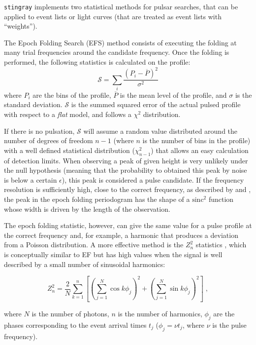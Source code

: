 \documentclass[twocolumn]{aastex62}
\newcommand{\zsq}{\ensuremath{Z^2_n}\xspace}
\newcommand{\stingray}{\texttt{stingray}\xspace}
\begin{document}
\stingray implements two statistical methods for pulsar searches, that can be applied to event lists or light curves (that are treated as event lists with ``weights'').

The Epoch Folding Search (EFS) method consists of executing the folding at many trial frequencies around the candidate frequency.
Once the folding is performed, the following statistics is calculated on the profile:
\begin{equation}
\mathcal{S} = \sum_i\frac{(P_i - \overline{P})^2}{\sigma^2}
\end{equation}
where $P_i$ are the bins of the profile, $\overline{P}$ is the mean level of the profile, and $\sigma$ is the standard deviation.
$\mathcal{S}$ is the summed squared error of the actual pulsed profile with respect to a \textit{flat} model, and follows a $\chi^2$ distribution.

If there is no pulsation, $\mathcal{S}$ will assume a random value distributed around the number of degrees of freedom $n - 1$ (where $n$ is the number of bins in the profile) with a well defined statistical distribution ($\chi^2_{n - 1}$) that allows an easy calculation of detection limits. 
When observing a peak of given height is very unlikely under the null hypothesis (meaning that the probability to obtained this peak by noise is below a certain $\epsilon$), this peak is considered a pulse candidate.
If the frequency resolution is sufficiently high, close to the correct frequency, as described by \citet{leahy1983b} and \citet{leahy1987}, the peak in the epoch folding periodogram has the shape of a $\mathrm{sinc}^2$ function whose width is driven by the length of the observation.

The epoch folding statistic, however, can give the same value for a pulse profile at the correct frequency and, for example, a harmonic that produces a deviation from a Poisson distribution.
A more effective method is the $Z^2_n$ statistics \citep{buccheri1983}, which is conceptually similar to EF but has high values when the signal is well described by a small number of sinusoidal harmonics: 

\begin{equation}
\zsq = \dfrac{2}{N} \sum_{k=1}^n \left[{\left(\sum_{j=1}^N \cos k \phi_j\right)}^2 + {\left(\sum_{j=1}^N \sin k \phi_j\right)}^2\right] \; ,
\end{equation}

\noindent where $N$ is the number of photons, $n$ is the number of harmonics, $\phi_j$ are the phases corresponding to the event arrival times $t_j$ ($\phi_j = \nu t_j$, where $\nu$ is the pulse frequency).
\end{document}
